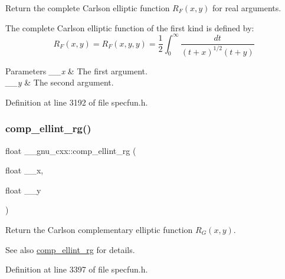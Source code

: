Return the complete Carlson elliptic function $ R_F(x,y) $ for real arguments.

The complete Carlson elliptic function of the first kind is defined by\+: \[ R_F(x,y) = R_F(x,y,y) = \frac{1}{2} \int_0^\infty \frac{dt}{(t + x)^{1/2}(t + y)} \]


\begin{DoxyParams}{Parameters}
{\em \+\_\+\+\_\+x} & The first argument. \\
\hline
{\em \+\_\+\+\_\+y} & The second argument. \\
\hline
\end{DoxyParams}


Definition at line 3192 of file specfun.\+h.

\mbox{\label{group__gnu__math__spec__func_ga978f8eec6e5edc918b243925dbacb65b}} 
\subsubsection{\texorpdfstring{comp\+\_\+ellint\+\_\+rg()}{comp\_ellint\_rg()}\hspace{0.1cm}{\footnotesize\ttfamily [1/3]}}
{\footnotesize\ttfamily float \+\_\+\+\_\+gnu\+\_\+cxx\+::comp\+\_\+ellint\+\_\+rg (\begin{DoxyParamCaption}\item[{float}]{\+\_\+\+\_\+x,  }\item[{float}]{\+\_\+\+\_\+y }\end{DoxyParamCaption})\hspace{0.3cm}{\ttfamily [inline]}}

Return the Carlson complementary elliptic function $ R_G(x,y) $.

\begin{DoxySeeAlso}{See also}
\hyperlink{group__gnu__math__spec__func_ga978f8eec6e5edc918b243925dbacb65b}{comp\+\_\+ellint\+\_\+rg} for details. 
\end{DoxySeeAlso}


Definition at line 3397 of file specfun.\+h.

\mbox{\label{group__gnu__math__spec__func_gaca5fa8ee8125afc8f35ec6b27806e873}} 

